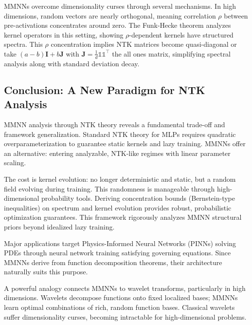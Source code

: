 \documentclass[a4paper]{article}
\theoremstyle{plain}
\theoremstyle{definition}
\theoremstyle{remark}
\begin{document}
\begin{tcolorbox}[colback=green!5,colframe=green!80!black,title={\textbf{Remark: High-Dimensional Advantages}},enhanced,drop shadow,boxrule=2pt]
MMNNs overcome dimensionality curses through several mechanisms. 
In high dimensions, random vectors are nearly orthogonal, meaning correlation $\rho$ between pre-activations concentrates around zero. 
The Funk-Hecke theorem analyzes kernel operators in this setting, showing $\rho$-dependent kernels have structured spectra. 
This $\rho$ concentration implies NTK matrices become quasi-diagonal or take $(a-b)\mathbf{I} + b\mathbf{J}$ with $\mathbf{J} = \frac{1}{d}\mathbf{\mathds{1}}\mathbf{\mathds{1}}^\top$ 
the all ones matrix, simplifying spectral analysis along with standard deviation decay.
\end{tcolorbox}




\subsection{Conclusion: A New Paradigm for NTK Analysis}
MMNN analysis through NTK theory reveals a fundamental trade-off and framework generalization. Standard NTK theory for MLPs requires quadratic overparameterization to guarantee static kernels and lazy training. MMNNs offer an alternative: entering analyzable, NTK-like regimes with linear parameter scaling.

The cost is kernel evolution: no longer deterministic and static, but a random field evolving during training. This randomness is manageable through high-dimensional probability tools. Deriving concentration bounds (Bernstein-type inequalities) on spectrum and kernel evolution provides robust, probabilistic optimization guarantees. This framework rigorously analyzes MMNN structural priors beyond idealized lazy training.

Major applications target Physics-Informed Neural Networks (PINNs) solving PDEs through neural network training satisfying governing equations. Since MMNNs derive from function decomposition theorems, their architecture naturally suits this purpose.

A powerful analogy connects MMNNs to wavelet transforms, particularly in high dimensions. Wavelets decompose functions onto fixed localized bases; MMNNs learn optimal combinations of rich, random function bases. Classical wavelets suffer dimensionality curses, becoming intractable for high-dimensional problems.
\end{document}

